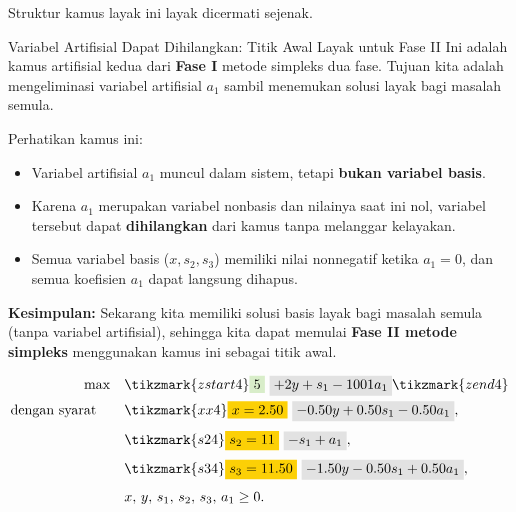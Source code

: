 \noindent Struktur kamus layak ini layak dicermati sejenak.
\begin{remark}{Variabel Artifisial Dapat Dihilangkan: Titik Awal Layak untuk Fase II}{}
Ini adalah kamus artifisial kedua dari \textbf{Fase I} metode simpleks dua fase. Tujuan kita adalah mengeliminasi variabel artifisial \(a_1\) sambil menemukan solusi layak bagi masalah semula.

Perhatikan kamus ini:
\begin{itemize}
    \item Variabel artifisial \(a_1\) muncul dalam sistem, tetapi \textbf{bukan variabel basis}.
    \item Karena \(a_1\) merupakan variabel nonbasis dan nilainya saat ini nol, variabel tersebut dapat \textbf{dihilangkan} dari kamus tanpa melanggar kelayakan.
    \item Semua variabel basis (\(x, s_2, s_3\)) memiliki nilai nonnegatif ketika \(a_1 = 0\), dan semua koefisien \(a_1\) dapat langsung dihapus.
\end{itemize}

\textbf{Kesimpulan:} Sekarang kita memiliki solusi basis layak bagi masalah semula (tanpa variabel artifisial), sehingga kita dapat memulai \textbf{Fase II metode simpleks} menggunakan kamus ini sebagai titik awal.

\vspace{1cm}

\[
\begin{aligned}
\max \quad 
& \tikzmark{zstart4} \text{\colorbox{green!20!white}{$5$}} ~ \text{\colorbox{gray!20!white}{$+ 2y + s_1 - 1001a_1$}} \tikzmark{zend4} \\
\st \quad 
& \tikzmark{xx4} \text{\colorbox{yellow}{$x = 2.50$}} ~ \text{\colorbox{gray!20!white}{$- 0.50y + 0.50s_1 - 0.50a_1$}},\\[1mm]
& \tikzmark{s24} \text{\colorbox{yellow}{$s_2 = 11$}} ~ \text{\colorbox{gray!20!white}{$- s_1 + a_1$}},\\[1mm]
& \tikzmark{s34} \text{\colorbox{yellow}{$s_3 = 11.50$}} ~ \text{\colorbox{gray!20!white}{$- 1.50y - 0.50s_1 + 0.50a_1$}},\\[1mm]
& x,\, y,\, s_1,\, s_2,\, s_3,\, a_1 \ge 0.
\end{aligned}
\]

\end{remark}

